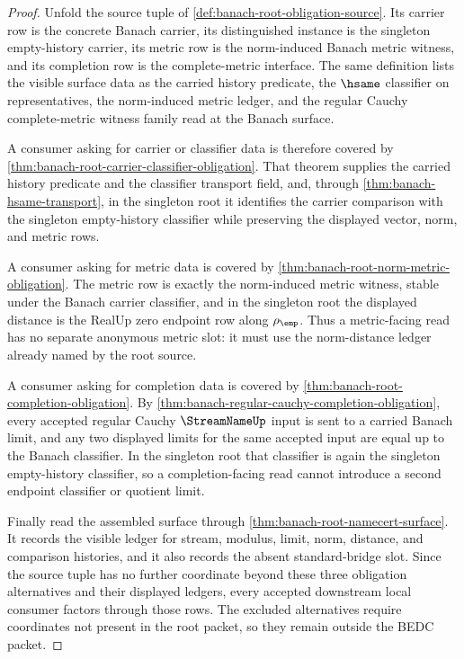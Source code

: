 \begin{proof}
Unfold the source tuple of \autoref{def:banach-root-obligation-source}. Its
carrier row is the concrete Banach carrier, its distinguished instance is the
singleton empty-history carrier, its metric row is the norm-induced Banach
metric witness, and its completion row is the complete-metric interface. The
same definition lists the visible surface data as the carried history
predicate, the $\hsame$ classifier on representatives, the norm-induced metric
ledger, and the regular Cauchy complete-metric witness family read at the
Banach surface.

A consumer asking for carrier or classifier data is therefore covered by
\autoref{thm:banach-root-carrier-classifier-obligation}. That theorem supplies
the carried history predicate and the classifier transport field, and, through
\autoref{thm:banach-hsame-transport}, in the singleton root it identifies the
carrier comparison with the singleton empty-history classifier while preserving
the displayed vector, norm, and metric rows.

A consumer asking for metric data is covered by
\autoref{thm:banach-root-norm-metric-obligation}. The metric row is exactly the
norm-induced metric witness, stable under the Banach carrier classifier, and in
the singleton root the displayed distance is the RealUp zero endpoint row along
$\rho_{\emp}$. Thus a metric-facing read has no separate anonymous metric slot:
it must use the norm-distance ledger already named by the root source.

A consumer asking for completion data is covered by
\autoref{thm:banach-root-completion-obligation}. By
\autoref{thm:banach-regular-cauchy-completion-obligation}, every accepted
regular Cauchy $\StreamNameUp$ input is sent to a carried Banach limit, and any
two displayed limits for the same accepted input are equal up to the Banach
classifier. In the singleton root that classifier is again the singleton
empty-history classifier, so a completion-facing read cannot introduce a second
endpoint classifier or quotient limit.

Finally read the assembled surface through
\autoref{thm:banach-root-namecert-surface}. It records the visible ledger for
stream, modulus, limit, norm, distance, and comparison histories, and it also
records the absent standard-bridge slot. Since the source tuple has no further
coordinate beyond these three obligation alternatives and their displayed
ledgers, every accepted downstream local consumer factors through those rows.
The excluded alternatives require coordinates not present in the root packet,
so they remain outside the BEDC packet.
\end{proof}
